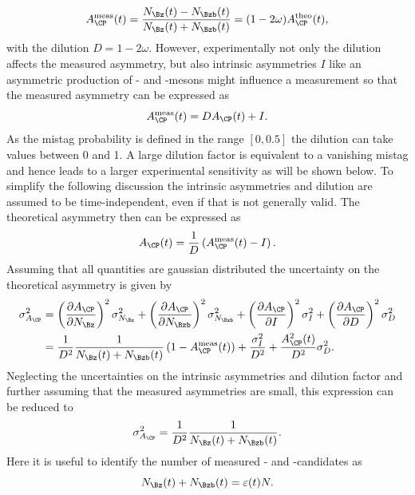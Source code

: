 \begin{equation}
A_{\CP}^{\text{meas}}(t)=\frac{N_{\Bz}(t)-N_{\Bzb}(t)}{N_{\Bz}(t)+N_{\Bzb}(t)}=(1-2\omega)A_{\CP}^{\text{theo}}(t),
\end{equation}
with the dilution $D=1-2\omega$.
However, experimentally not only the dilution affects the measured asymmetry, but also intrinsic asymmetries $I$ like an asymmetric production of \Bz- and \Bzb-mesons might influence a measurement so that the measured asymmetry can be expressed as
\begin{equation}
A_{\CP}^{\text{meas}}(t)=DA_{\CP}(t)+I.
\end{equation}
As the mistag probability is defined in the range $[0, 0.5]$ the dilution can take values between \num{0} and \num{1}.
A large dilution factor is equivalent to a vanishing mistag and hence leads to a larger experimental sensitivity as will be shown below.
To simplify the following discussion the intrinsic asymmetries and dilution are assumed to be time-independent, even if that is not generally valid.
The theoretical asymmetry then can be expressed as
\begin{equation}
A_{\CP}(t)=\frac{1}{D}\left(A_{\CP}^{\text{meas}}(t)-I\right).
\end{equation}
Assuming that all quantities are gaussian distributed the uncertainty on the theoretical asymmetry is given by
\begin{equation}
\begin{aligned}
\sigma_{A_{\CP}}^2&=\left(\frac{\partial A_{\CP}}{\partial N_{\Bz}}\right)^2\sigma_{N_{\Bz}}^2+\left(\frac{\partial A_{\CP}}{\partial N_{\Bzb}}\right)^2\sigma_{N_{\Bzb}}^2+\left(\frac{\partial A_{\CP}}{\partial I}\right)^2\sigma_{I}^2+\left(\frac{\partial A_{\CP}}{\partial D}\right)^2\sigma_{D}^2\\
&=\frac{1}{D^2}\frac{1}{N_{\Bz}(t)+N_{\Bzb}(t)}\left(1-A_{\CP}^{\text{meas}}(t)\right)+\frac{\sigma_{I}^2}{D^2}+\frac{A_{\CP}^2(t)}{D^2}\sigma_{D}^2.
\end{aligned}
\end{equation}
Neglecting the uncertainties on the intrinsic asymmetries and dilution factor and further assuming that the measured asymmetries are small, this expression can be reduced to
\begin{equation}
\sigma_{A_{\CP}}^2=\frac{1}{D^2}\frac{1}{N_{\Bz}(t)+N_{\Bzb}(t)}.
\end{equation}
Here it is useful to identify the number of measured \Bz- and \Bzb-candidates as
\begin{equation}
N_{\Bz}(t)+N_{\Bzb}(t)=\varepsilon(t)N.
\end{equation}
